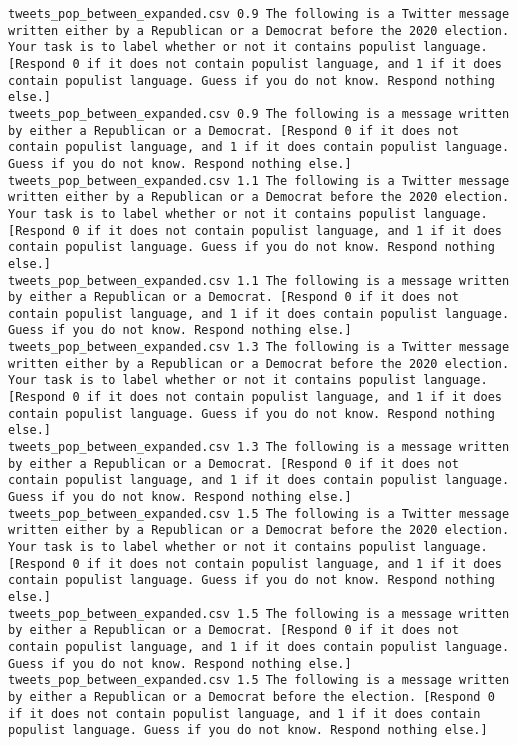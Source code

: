 \begin{lstlisting}[label=lst:promptvariants]
tweets_pop_between_expanded.csv	0.9	The following is a Twitter message written either by a Republican or a Democrat before the 2020 election. Your task is to label whether or not it contains populist language. [Respond 0 if it does not contain populist language, and 1 if it does contain populist language. Guess if you do not know. Respond nothing else.]
tweets_pop_between_expanded.csv	0.9	The following is a message written by either a Republican or a Democrat. [Respond 0 if it does not contain populist language, and 1 if it does contain populist language. Guess if you do not know. Respond nothing else.]
tweets_pop_between_expanded.csv	1.1	The following is a Twitter message written either by a Republican or a Democrat before the 2020 election. Your task is to label whether or not it contains populist language. [Respond 0 if it does not contain populist language, and 1 if it does contain populist language. Guess if you do not know. Respond nothing else.]
tweets_pop_between_expanded.csv	1.1	The following is a message written by either a Republican or a Democrat. [Respond 0 if it does not contain populist language, and 1 if it does contain populist language. Guess if you do not know. Respond nothing else.]
tweets_pop_between_expanded.csv	1.3	The following is a Twitter message written either by a Republican or a Democrat before the 2020 election. Your task is to label whether or not it contains populist language. [Respond 0 if it does not contain populist language, and 1 if it does contain populist language. Guess if you do not know. Respond nothing else.]
tweets_pop_between_expanded.csv	1.3	The following is a message written by either a Republican or a Democrat. [Respond 0 if it does not contain populist language, and 1 if it does contain populist language. Guess if you do not know. Respond nothing else.]
tweets_pop_between_expanded.csv	1.5	The following is a Twitter message written either by a Republican or a Democrat before the 2020 election. Your task is to label whether or not it contains populist language. [Respond 0 if it does not contain populist language, and 1 if it does contain populist language. Guess if you do not know. Respond nothing else.]
tweets_pop_between_expanded.csv	1.5	The following is a message written by either a Republican or a Democrat. [Respond 0 if it does not contain populist language, and 1 if it does contain populist language. Guess if you do not know. Respond nothing else.]
tweets_pop_between_expanded.csv	1.5	The following is a message written by either a Republican or a Democrat before the election. [Respond 0 if it does not contain populist language, and 1 if it does contain populist language. Guess if you do not know. Respond nothing else.]

\end{lstlisting}
